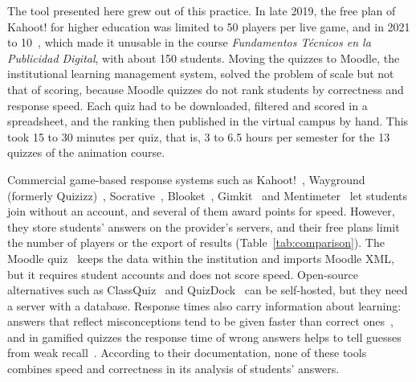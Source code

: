 \documentclass[preprint,12pt, a4paper]{elsarticle}
\begin{document}
The tool presented here grew out of this practice. In late 2019, the free plan of Kahoot! for higher education was limited to 50 players per live game, and in 2021 to 10~\cite{kahoot2019,kahoot2021}, which made it unusable in the course \emph{Fundamentos Técnicos en la Publicidad Digital}, with about 150 students. Moving the quizzes to Moodle, the institutional learning management system, solved the problem of scale but not that of scoring, because Moodle quizzes do not rank students by correctness and response speed. Each quiz had to be downloaded, filtered and scored in a spreadsheet, and the ranking then published in the virtual campus by hand. This took 15 to 30 minutes per quiz, that is, 3 to 6.5 hours per semester for the 13 quizzes of the animation course.

Commercial game-based response systems such as Kahoot!~\cite{kahoot}, Wayground (formerly Quizizz)~\cite{wayground}, Socrative~\cite{socrative}, Blooket~\cite{blooket}, Gimkit~\cite{gimkit} and Mentimeter~\cite{mentimeter} let students join without an account, and several of them award points for speed. However, they store students' answers on the provider's servers, and their free plans limit the number of players or the export of results (Table~\ref{tab:comparison}). The Moodle quiz~\cite{moodlequiz} keeps the data within the institution and imports Moodle XML, but it requires student accounts and does not score speed. Open-source alternatives such as ClassQuiz~\cite{classquiz} and QuizDock~\cite{quizdock} can be self-hosted, but they need a server with a database. Response times also carry information about learning: answers that reflect misconceptions tend to be given faster than correct ones~\cite{heckler2015}, and in gamified quizzes the response time of wrong answers helps to tell guesses from weak recall~\cite{liang2024}. According to their documentation, none of these tools combines speed and correctness in its analysis of students' answers.
\end{document}
